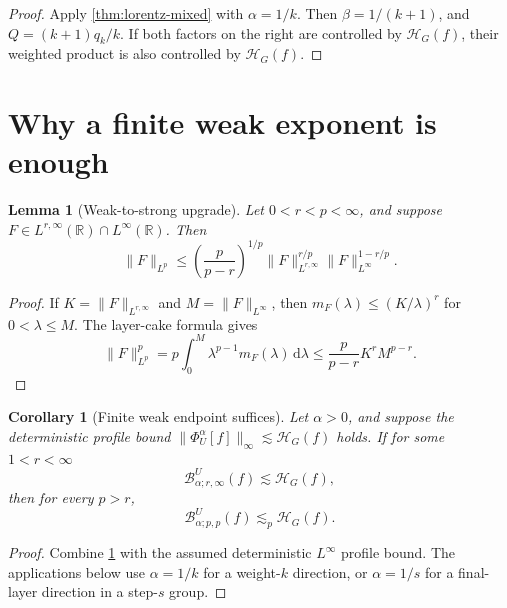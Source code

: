 \documentclass[11pt]{article}
\newtheorem{lemma}[theorem]{Lemma}
\newtheorem{corollary}[theorem]{Corollary}
\theoremstyle{definition}
\theoremstyle{remark}
\newcommand{\R}{\mathbb R}
\newcommand{\dd}{\,\mathrm d}
\newcommand{\norm}[1]{\lVert #1\rVert}
\newcommand{\HH}{\mathcal H}
\newcommand{\B}[4]{\mathcal B^{#1}_{#2;#3,#4}}
\newcommand{\Bw}[3]{\mathcal B^{#1}_{#2;#3,\infty}}
\newcommand{\prof}[3]{\Phi^{#1}_{#2}[#3]}
\newcommand{\less}{\lesssim}
\begin{document}
\begin{proof}
Apply \cref{thm:lorentz-mixed} with \(\alpha=1/k\).  Then
\(\beta=1/(k+1)\), and \(Q=(k+1)q_k/k\).  If both factors on the right are controlled
by \(\HH_G(f)\), their weighted product is also controlled by \(\HH_G(f)\).
\end{proof}

\section{Why a finite weak exponent is enough}\label{sec:weak}

\begin{lemma}[Weak-to-strong upgrade]\label{lem:weak-strong}
Let \(0<r<p<\infty\), and suppose \(F\in L^{r,\infty}(\R)\cap L^\infty(\R)\).  Then
\begin{equation}\label{eq:weak-strong}
 \norm{F}_{L^p}
 \le\left(\frac{p}{p-r}\right)^{1/p}
 \norm{F}_{L^{r,\infty}}^{r/p}
 \norm{F}_{L^\infty}^{1-r/p}.
\end{equation}
\end{lemma}

\begin{proof}
If \(K=\norm{F}_{L^{r,\infty}}\) and \(M=\norm{F}_{L^\infty}\), then
\(m_F(\lambda)\le(K/\lambda)^r\) for \(0<\lambda\le M\).  The layer-cake formula gives
\[
 \norm{F}_{L^p}^p
 =p\int_0^M\lambda^{p-1}m_F(\lambda)\dd\lambda
 \le\frac{p}{p-r}K^rM^{p-r}.
\]
\end{proof}

\begin{corollary}[Finite weak endpoint suffices]\label{cor:weak-suffices}
Let \(\alpha>0\), and suppose the deterministic profile bound
\(\norm{\prof{\alpha}{U}{f}}_\infty\lesssim\HH_G(f)\) holds.  If for some
\(1<r<\infty\)
\begin{equation}\label{eq:weakassume}
 \Bw{U}{\alpha}{r}(f)\less\HH_G(f),
\end{equation}
then for every \(p>r\),
\begin{equation}\label{eq:strongabove}
 \B{U}{\alpha}{p}{p}(f)\less_p\HH_G(f).
\end{equation}
\end{corollary}

\begin{proof}
Combine \cref{lem:weak-strong} with the assumed deterministic \(L^\infty\) profile
bound.  The applications below use \(\alpha=1/k\) for a weight-\(k\) direction, or
\(\alpha=1/s\) for a final-layer direction in a step-\(s\) group.
\end{proof}
\end{document}
